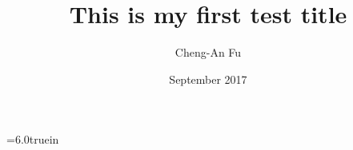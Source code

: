 %
%
\renewcommand{\thechapter}{\arabic{chapter}}
\textwidth=6.0truein \topmargin=-1cm



\title{This is my first test title}



\author{Cheng-An Fu}



\date{September 2017}

\maketitle \clearpage {} \pagestyle{plain}
%
\tableofcontents \listoffigures \listoftables {}
\pssilent \pagestyle{plain} \doublespace
\setlength{\baselineskip}{4ex}
\newtheorem{definition}{Definition}
\renewcommand{\thedefinition}{\arabic{definition}.}
\newtheorem{theorem}{Theorem}
\renewcommand{\thetheorem}{\arabic{theorem}.}
\newtheorem{lemma}{Lemma}
\renewcommand{\thelemma}{\arabic{lemma}.}
\newcommand{\ecc}{\stepcounter{ec} \arabic{ec}}













\appendix
%

